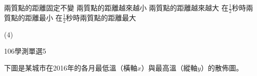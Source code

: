 \begin{QUESTIONS}
\begin{QUESTION}
\begin{QBODY}
        \begin{QOPS}
            \QOP 兩質點的距離固定不變
            \QOP 兩質點的距離越來越小
            \QOP 兩質點的距離越來越大
            \QOP 在$\frac{1}{2}$秒時兩質點的距離最小
            \QOP 在$\frac{1}{2}$秒時兩質點的距離最大
        \end{QOPS}
        \end{QBODY}
        \begin{QFROMS}
        \end{QFROMS}
        \begin{QTAGS}
        \end{QTAGS}
        \begin{QANS}
            (4)
        \end{QANS}
        \begin{QSOL}
        \end{QSOL}
        \begin{QEMPTYSPACE}
        \end{QEMPTYSPACE}
    \end{QUESTION}
    \begin{QUESTION}
        \begin{ExamInfo}{106}{學測}{單選}{5}
        \end{ExamInfo}
        \begin{QBODY}
            下圖是某城市在2016年的各月最低溫（橫軸$x$）與最高溫（縱軸$y$）的散佈圖。
        

\end{QBODY}
\end{QUESTION}
\end{QUESTIONS}
